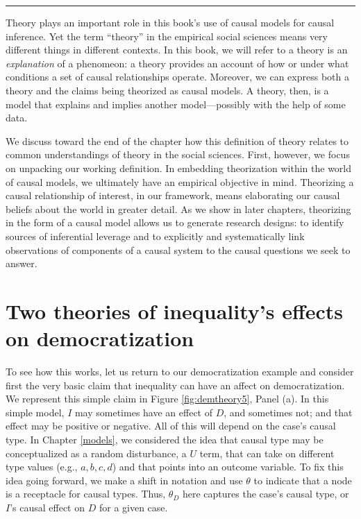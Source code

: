 \documentclass[12pt,]{book}
\begin{document}
\begin{center}\rule{0.5\linewidth}{\linethickness}\end{center}

Theory plays an important role in this book's use of causal models for causal inference. Yet the term ``theory'' in the empirical social sciences means very different things in different contexts. In this book, we will refer to a theory is an \emph{explanation} of a phenomeon: a theory provides an account of how or under what conditions a set of causal relationships operate. Moreover, we can express both a theory and the claims being theorized as causal models. A theory, then, is a model that explains and implies another model---possibly with the help of some data.

We discuss toward the end of the chapter how this definition of theory relates to common understandings of theory in the social sciences. First, however, we focus on unpacking our working definition. In embedding theorization within the world of causal models, we ultimately have an empirical objective in mind. Theorizing a causal relationship of interest, in our framework, means elaborating our causal beliefs about the world in greater detail. As we show in later chapters, theorizing in the form of a causal model allows us to generate research designs: to identify sources of inferential leverage and to explicitly and systematically link observations of components of a causal system to the causal questions we seek to answer.

\hypertarget{inequalitytheory}{%
\section{Two theories of inequality's effects on democratization}\label{inequalitytheory}}

To see how this works, let us return to our democratization example and consider first the very basic claim that inequality can have an affect on democratization. We represent this simple claim in Figure \ref{fig:demtheory5}, Panel (a). In this simple model, \(I\) may sometimes have an effect of \(D\), and sometimes not; and that effect may be positive or negative. All of this will depend on the case's causal type. In Chapter \ref{models}, we considered the idea that causal type may be conceptualized as a random disturbance, a \(U\) term, that can take on different type values (e.g., \(a, b, c, d\)) and that points into an outcome variable. To fix this idea going forward, we make a shift in notation and use \(\theta\) to indicate that a node is a receptacle for causal types. Thus, \(\theta_D\) here captures the case's causal type, or \(I\)'s causal effect on \(D\) for a given case.
\end{document}
